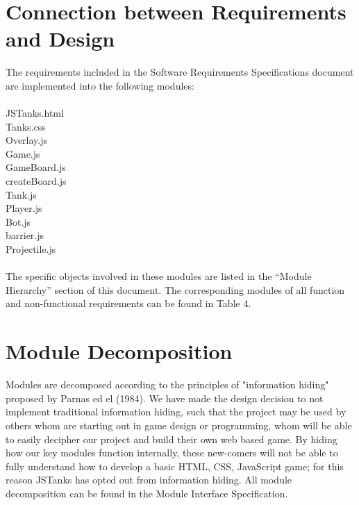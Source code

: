 \documentclass{article}
\begin{document}
\section{Connection between Requirements and Design}
The requirements included in the Software Requirements Specifications document are implemented into the following modules: \\ \\
JSTanks.html \\ 
Tanks.css \\
Overlay.js \\
Game.js \\
GameBoard.js \\
createBoard.js \\
Tank.js \\
Player.js \\
Bot.js \\
barrier.js \\
Projectile.js \\ \\
The specific objects involved in these modules are listed in the “Module Hierarchy” section of this document. The corresponding modules of all function and non-functional requirements can be found in Table 4.


\section{Module Decomposition}
Modules are decomposed according to the principles of "information hiding" proposed by Parnas ed el (1984). We have made the design decision to not implement traditional information hiding, such that the project may be used by others whom are starting out in game design or programming, whom will be able to easily decipher our project and build their own web based game. By hiding how our key modules function internally, these new-comers will not be able to fully understand how to develop a basic HTML, CSS, JavaScript game; for this reason JSTanks has opted out from information hiding. All module decomposition can be found in the Module Interface Specification. 
\end{document}
